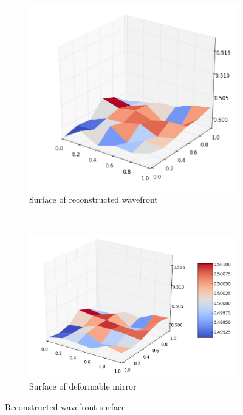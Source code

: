 \documentclass[]{article}
\begin{document}
\begin{figure}[h!]
        \centering
        \begin{subfigure}[b]{0.5\textwidth}
                \includegraphics[width=\textwidth]{figures/surf_phi_hat}
                \caption{Surface of reconstructed wavefront}
                \label{fig:surf_phi_hat}
        \end{subfigure}%
        ~ %
        \begin{subfigure}[b]{0.6\textwidth}
                \includegraphics[width=\textwidth]{figures/surf_phi_dm}
                \caption{Surface of deformable mirror}
                \label{fig:surf_phi_dm}
        \end{subfigure}
        \caption{Reconstructed wavefront surface}
        \label{fig:surf}
\end{figure}
\end{document}

